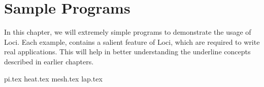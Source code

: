 \chapter { Sample Programs }
In this chapter, we will extremely simple programs to demonstrate the usage
of Loci. Each example, contains a salient feature of Loci, which are required
to write real applications. This will help in better understanding the underline
concepts described in earlier chapters.

 {pi.tex}
 {heat.tex}
 {mesh.tex}
 {lap.tex}
